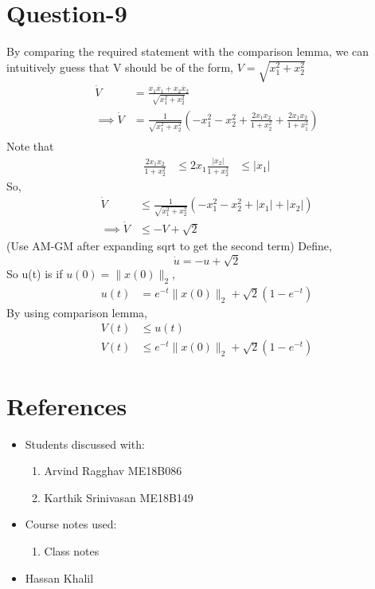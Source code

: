 \documentclass{article}
\begin{document}
\section*{Question-9}
By comparing the required statement with the comparison lemma, we can intuitively guess that V should be of the form, $V = \sqrt{x_1^2 + x_2^2}$ \\
\begin{align*}
    \dot{V} &= \frac{x_1\dot{x_1} + x_2\dot{x_2} }{\sqrt{x_1^2 + x_2^2}} \\
    \implies \dot{V} &= \frac{1}{\sqrt{x_1^2 + x_2^2}}(-x_1^2-x_2^2+\frac{2x_1x_2}{1+x_2^2} + \frac{2x_1x_2}{1+x_1^2}) \\
\end{align*}
Note that 
\begin{align*}
    \frac{2x_1x_2}{1+x_2^2}  &\leq 2x_1\frac{|x_2|}{1+x_2^2}
    &\leq |x_1|
\end{align*}
So,
\begin{align}
    \dot{V} &\leq \frac{1}{\sqrt{x_1^2 + x_2^2}}(-x_1^2-x_2^2+|x_1|+|x_2|) \\
    \implies \dot{V} &\leq -V + \sqrt{2}
\end{align}
(Use AM-GM after expanding sqrt to get the second term)
Define,
\begin{equation}
    \dot{u} = -u + \sqrt{2}
\end{equation}
So u(t) is if $u(0) = \|x(0)\|_2$,
\begin{align*}
    u(t) &= e^{-t}\|x(0)\|_2 + \sqrt{2}(1-e^{-t})
\end{align*}
By using comparison lemma,
\begin{align*}
    V(t) &\leq u(t) \\
    V(t) &\leq e^{-t}\|x(0)\|_2 + \sqrt{2}(1-e^{-t})
\end{align*}


\section*{References}
\begin{itemize}
    \item Students discussed with:
    \begin{enumerate}
        \item Arvind Ragghav ME18B086
        \item Karthik Srinivasan ME18B149
    \end{enumerate}
    \item Course notes used:
    \begin{enumerate}
        \item Class notes
    \end{enumerate}
    \item Hassan Khalil
\end{itemize}
\end{document}
